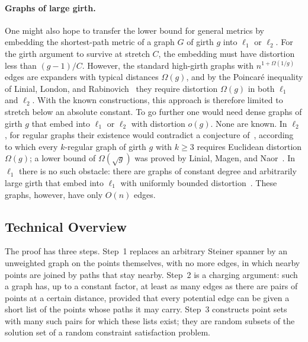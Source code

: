 \documentclass[11pt]{article}
\theoremstyle{definition}
\theoremstyle{remark}
\begin{document}
\paragraph{Graphs of large girth.}
One might also hope to transfer the lower bound for general metrics by embedding the shortest-path metric of a graph $G$ of girth $g$ into $\ell_1$ or $\ell_2$. For the girth argument to survive at stretch $C$, the embedding must have distortion less than $(g - 1)/C$. However, the standard high-girth graphs with $n^{1 + \Omega(1/g)}$ edges are expanders with typical distances $\Omega(g)$, and by the Poincar\'e inequality of Linial, London, and Rabinovich~\cite{linial1995geometry} they require distortion $\Omega(g)$ in both $\ell_1$ and $\ell_2$. With the known constructions, this approach is therefore limited to stretch below an absolute constant. To go further one would need dense graphs of girth $g$ that embed into $\ell_1$ or $\ell_2$ with distortion $o(g)$. None are known. In $\ell_2$, for regular graphs their existence would contradict a conjecture of~\cite{linial1995geometry}, according to which every $k$-regular graph of girth $g$ with $k \ge 3$ requires Euclidean distortion $\Omega(g)$; a lower bound of $\Omega(\sqrt{g})$ was proved by Linial, Magen, and Naor~\cite{linial2002girth}. In $\ell_1$ there is no such obstacle: there are graphs of constant degree and arbitrarily large girth that embed into $\ell_1$ with uniformly bounded distortion~\cite{ostrovskii2012low}. These graphs, however, have only $O(n)$ edges.

\subsection{Technical Overview}
\label{subsec:intuition}

The proof has three steps. Step~1 replaces an arbitrary Steiner spanner by an unweighted graph on the points themselves, with no more edges, in which nearby points are joined by paths that stay nearby. Step~2 is a charging argument: such a graph has, up to a constant factor, at least as many edges as there are pairs of points at a certain distance, provided that every potential edge can be given a short list of the points whose paths it may carry. Step~3 constructs point sets with many such pairs for which these lists exist; they are random subsets of the solution set of a random constraint satisfaction problem.
\end{document}
